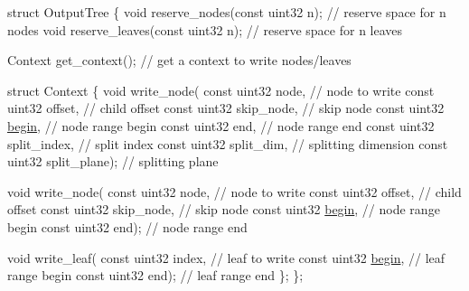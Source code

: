 \begin{DoxyCode}
\textcolor{keyword}{struct }OutputTree
\{
   \textcolor{keywordtype}{void} reserve\_nodes(\textcolor{keyword}{const} uint32 n);  \textcolor{comment}{// reserve space for n nodes}
   \textcolor{keywordtype}{void} reserve\_leaves(\textcolor{keyword}{const} uint32 n); \textcolor{comment}{// reserve space for n leaves}

   Context get\_context();             \textcolor{comment}{// get a context to write nodes/leaves}

   \textcolor{keyword}{struct }Context
   \{
       \textcolor{keywordtype}{void} write\_node(
          \textcolor{keyword}{const} uint32 node,          \textcolor{comment}{// node to write}
          \textcolor{keyword}{const} uint32 offset,        \textcolor{comment}{// child offset}
          \textcolor{keyword}{const} uint32 skip\_node,     \textcolor{comment}{// skip node}
          \textcolor{keyword}{const} uint32 \hyperlink{namespacecugar_a2121df08f967e232ea5fe0ee378dee67}{begin},         \textcolor{comment}{// node range begin}
          \textcolor{keyword}{const} uint32 end,           \textcolor{comment}{// node range end}
          \textcolor{keyword}{const} uint32 split\_index,   \textcolor{comment}{// split index}
          \textcolor{keyword}{const} uint32 split\_dim,     \textcolor{comment}{// splitting dimension}
          \textcolor{keyword}{const} uint32 split\_plane);  \textcolor{comment}{// splitting plane}

       \textcolor{keywordtype}{void} write\_node(
          \textcolor{keyword}{const} uint32 node,          \textcolor{comment}{// node to write}
          \textcolor{keyword}{const} uint32 offset,        \textcolor{comment}{// child offset}
          \textcolor{keyword}{const} uint32 skip\_node,     \textcolor{comment}{// skip node}
          \textcolor{keyword}{const} uint32 \hyperlink{namespacecugar_a2121df08f967e232ea5fe0ee378dee67}{begin},         \textcolor{comment}{// node range begin}
          \textcolor{keyword}{const} uint32 end);          \textcolor{comment}{// node range end}

       \textcolor{keywordtype}{void} write\_leaf(
          \textcolor{keyword}{const} uint32 index,         \textcolor{comment}{// leaf to write}
          \textcolor{keyword}{const} uint32 \hyperlink{namespacecugar_a2121df08f967e232ea5fe0ee378dee67}{begin},         \textcolor{comment}{// leaf range begin}
          \textcolor{keyword}{const} uint32 end);          \textcolor{comment}{// leaf range end}
   \};
\};
\end{DoxyCode}


